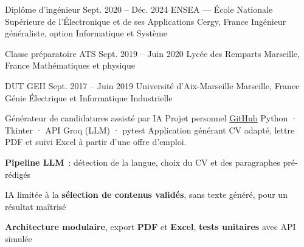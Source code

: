 \documentclass[10pt]{article}
\begin{document}
\begin{cvmain}
\begin{cvtimeline}
\end{cvtimeline}

\begin{cvtimeline}

\cveducation
  {Diplôme d’ingénieur}
  {Sept. 2020 -- Déc. 2024}
  {ENSEA — École Nationale Supérieure de l’Électronique et de ses Applications}
  {Cergy, France}
  {Ingénieur généraliste, option Informatique et Système}

\cvsep
\cveducation
  {Classe préparatoire ATS}
  {Sept. 2019 -- Juin 2020}
  {Lycée des Remparts}
  {Marseille, France}
  {Mathématiques et physique}

\cvsep
\cveducation
  {DUT GEII}
  {Sept. 2017 -- Juin 2019}
  {Université d’Aix-Marseille}
  {Marseille, France}
  {Génie Électrique et Informatique Industrielle}

\end{cvtimeline}

\begin{cvtimeline}

\cvproject
  {Générateur de candidatures assisté par IA}
  {Projet personnel}
  {\href{https://github.com/thomas-fuzellier/AI-Job-Application-Optimizer}{GitHub}}
  {Python · Tkinter · API Groq (LLM) · pytest}
  {Application générant CV adapté, lettre PDF et suivi Excel à partir d’une offre d’emploi.}
\begin{cvitems}
  \item \textbf{Pipeline LLM}~: détection de la langue, choix du CV et des paragraphes pré-rédigés
  \item IA limitée à la \textbf{sélection de contenus validés}, sans texte généré, pour un résultat maîtrisé
  \item \textbf{Architecture modulaire}, export \textbf{PDF} et \textbf{Excel}, \textbf{tests unitaires} avec API simulée
\end{cvitems}

\end{cvtimeline}

\end{cvmain}
\end{document}
